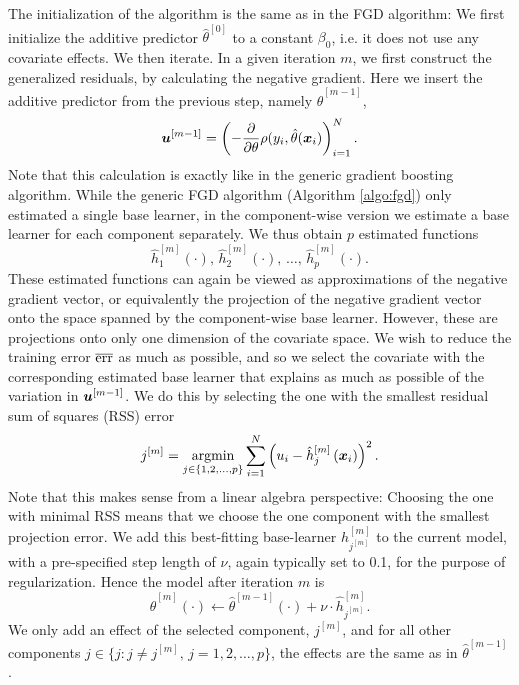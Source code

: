 The initialization of the algorithm is the same as in the FGD algorithm:
We first initialize the additive predictor $\hat{\theta}^{[0]}$ to a constant $\beta_0$, i.e. it does not use any covariate effects.
We then iterate.
In a given iteration $m$, we first construct the generalized residuals, by calculating the negative gradient.
Here we insert the additive predictor from the previous step, namely $\hat{\theta}^{[m-1]}$,
\begin{equation*}
    \bm{u}^{[m-1]}=\left(-\frac{\partial}{\partial \theta}\rho(y_i, \hat{\theta}(\bm{x}_i)\right)_{i=1}^N.
\end{equation*}
Note that this calculation is exactly like in the generic gradient boosting algorithm.
While the generic FGD algorithm (Algorithm \ref{algo:fgd}) only estimated a single base learner, in the component-wise version we estimate a base learner for each component separately.
We thus obtain $p$ estimated functions
\begin{equation*}
    \hat{h}_1^{[m]}(\cdot),\,\hat{h}_2^{[m]}(\cdot),\,\ldots,\,\hat{h}_p^{[m]}(\cdot).
\end{equation*}
These estimated functions can again be viewed as approximations of the negative gradient vector, or equivalently the projection of the negative gradient vector onto the space spanned by the component-wise base learner.
However, these are projections onto only one dimension of the covariate space.
We wish to reduce the training error $\overline{\text{err}}$ as much as possible, and so we select the covariate with the corresponding estimated base learner that explains as much as possible of the variation in $\bm{u}^{[m-1]}$.
We do this by selecting the one with the smallest residual sum of squares (RSS) error
\begin{equation*}
    j^{[m]}=\operatorname*{argmin}_{j\in\{1,2,\ldots,p\}}\sum_{i=1}^N \left(u_i-\hat{h}_j^{[m]}\left(\bm{x}_i\right)\right)^2.
\end{equation*}
Note that this makes sense from a linear algebra perspective:
Choosing the one with minimal RSS means that we choose the one component with the smallest projection error.
We add this best-fitting base-learner $h_{j^{[m]}}^{[m]}$ to the current model, with a pre-specified step length of $\nu$, again typically set to 0.1, for the purpose of regularization.
Hence the model after iteration $m$ is
\begin{equation*}
    \hat{\theta}^{[m]}(\cdot)\gets \hat{\theta}^{[m-1]}(\cdot)+\nu\cdot\hat{h}^{[m]}_{j^{[m]}}.
\end{equation*}
We only add an effect of the selected component, $j^{[m]}$, and for all other components $j\in\{j\colon j\neq j^{[m]},\,j=1,2,\ldots,p\}$, the effects are the same as in $\hat{\theta}^{[m-1]}$.
